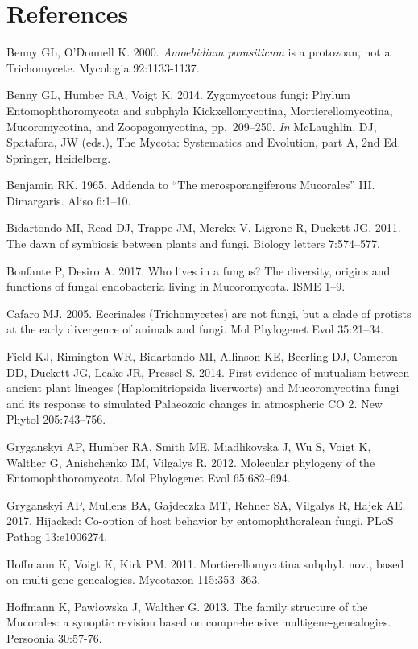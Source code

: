 \documentclass[]{book}
\begin{document}
\section{References}\label{references}

Benny GL, O'Donnell K. 2000. \emph{Amoebidium parasiticum} is a
protozoan, not a Trichomycete. Mycologia 92:1133-1137.

Benny GL, Humber RA, Voigt K. 2014. Zygomycetous fungi: Phylum
Entomophthoromycota and subphyla Kickxellomycotina, Mortierellomycotina,
Mucoromycotina, and Zoopagomycotina, pp.~209--250. \emph{In} McLaughlin,
DJ, Spatafora, JW (eds.), The Mycota: Systematics and Evolution, part A,
2nd Ed. Springer, Heidelberg.

Benjamin RK. 1965. Addenda to ``The merosporangiferous Mucorales'' III.
Dimargaris. Aliso 6:1--10.

Bidartondo MI, Read DJ, Trappe JM, Merckx V, Ligrone R, Duckett JG.
2011. The dawn of symbiosis between plants and fungi. Biology letters
7:574--577.

Bonfante P, Desiro A. 2017. Who lives in a fungus? The diversity,
origins and functions of fungal endobacteria living in Mucoromycota.
ISME 1--9.

Cafaro MJ. 2005. Eccrinales (Trichomycetes) are not fungi, but a clade
of protists at the early divergence of animals and fungi. Mol Phylogenet
Evol 35:21--34.

Field KJ, Rimington WR, Bidartondo MI, Allinson KE, Beerling DJ, Cameron
DD, Duckett JG, Leake JR, Pressel S. 2014. First evidence of mutualism
between ancient plant lineages (Haplomitriopsida liverworts) and
Mucoromycotina fungi and its response to simulated Palaeozoic changes in
atmospheric CO 2. New Phytol 205:743--756.

Gryganskyi AP, Humber RA, Smith ME, Miadlikovska J, Wu S, Voigt K,
Walther G, Anishchenko IM, Vilgalys R. 2012. Molecular phylogeny of the
Entomophthoromycota. Mol Phylogenet Evol 65:682--694.

Gryganskyi AP, Mullens BA, Gajdeczka MT, Rehner SA, Vilgalys R, Hajek
AE. 2017. Hijacked: Co-option of host behavior by entomophthoralean
fungi. PLoS Pathog 13:e1006274.

Hoffmann K, Voigt K, Kirk PM. 2011. Mortierellomycotina subphyl. nov.,
based on multi-gene genealogies. Mycotaxon 115:353--363.

Hoffmann K, Pawłowska J, Walther G. 2013. The family structure of the
Mucorales: a synoptic revision based on comprehensive
multigene-genealogies. Persoonia 30:57-76.
\end{document}
